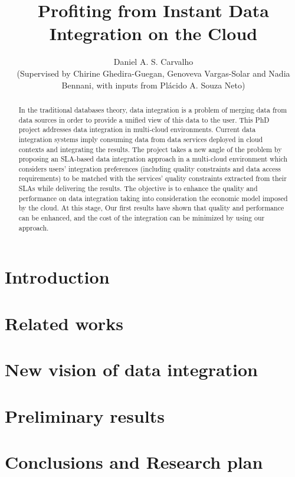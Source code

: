 \documentclass{llncs}
\theoremstyle{plain}
\theoremstyle{plain}
\theoremstyle{plain}
\theoremstyle{plain}
\begin{document}
 

\title{Profiting from Instant Data Integration on the Cloud}
\author{Daniel A. S. Carvalho \\ (Supervised by Chirine Ghedira-Guegan, Genoveva Vargas-Solar and
	   Nadia Bennani, with inputs from Pl\'acido A. Souza Neto)}
 

\maketitle

  
\begin{abstract}
In the traditional databases theory, data integration is a problem of merging data from data sources in order to provide a unified view of this data to the user. This PhD project addresses data integration in multi-cloud environments. Current data integration systems imply consuming data from data services deployed in cloud contexts and integrating the results.
The project takes a new angle of the problem by proposing an SLA-based data integration approach in a multi-cloud environment which considers users' integration preferences (including quality constraints and data access requirements) to be matched with the services' quality constraints extracted from their SLAs while delivering the results. 
The objective is to enhance the quality and performance on data integration taking into consideration the economic model imposed by the cloud. At this stage, Our first results have shown that quality and performance can be enhanced, and the cost of the integration can be minimized by using our approach. 
\end{abstract}
 
 

\section{Introduction}


\section{Related works}


\section{New vision of data integration}


\section{Preliminary results}


\section{Conclusions and Research plan}


 
 

\end{document}
